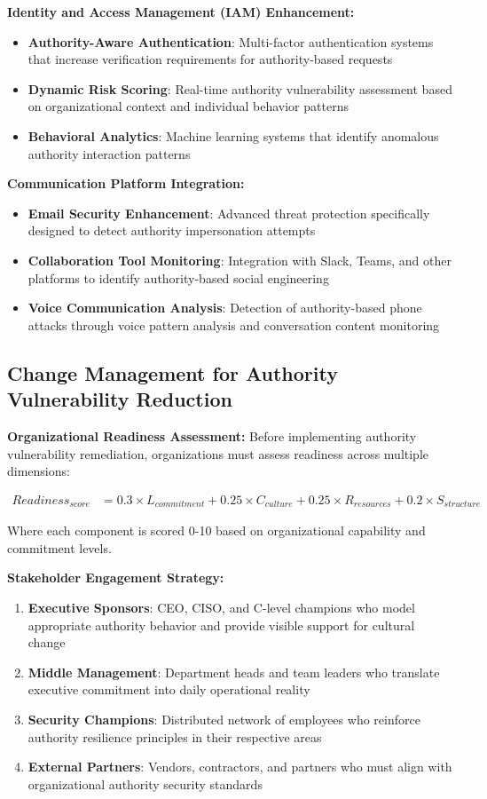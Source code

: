 \documentclass[11pt,a4paper]{article}
\begin{document}
\textbf{Identity and Access Management (IAM) Enhancement:}
\begin{itemize}
\item \textbf{Authority-Aware Authentication}: Multi-factor authentication systems that increase verification requirements for authority-based requests
\item \textbf{Dynamic Risk Scoring}: Real-time authority vulnerability assessment based on organizational context and individual behavior patterns
\item \textbf{Behavioral Analytics}: Machine learning systems that identify anomalous authority interaction patterns
\end{itemize}

\textbf{Communication Platform Integration:}
\begin{itemize}
\item \textbf{Email Security Enhancement}: Advanced threat protection specifically designed to detect authority impersonation attempts
\item \textbf{Collaboration Tool Monitoring}: Integration with Slack, Teams, and other platforms to identify authority-based social engineering
\item \textbf{Voice Communication Analysis}: Detection of authority-based phone attacks through voice pattern analysis and conversation content monitoring
\end{itemize}

\subsection{Change Management for Authority Vulnerability Reduction}

\textbf{Organizational Readiness Assessment:}
Before implementing authority vulnerability remediation, organizations must assess readiness across multiple dimensions:

\begin{align}
Readiness_{score} &= 0.3 \times L_{commitment} + 0.25 \times C_{culture} + 0.25 \times R_{resources} + 0.2 \times S_{structure}
\end{align}

Where each component is scored 0-10 based on organizational capability and commitment levels.

\textbf{Stakeholder Engagement Strategy:}
\begin{enumerate}
\item \textbf{Executive Sponsors}: CEO, CISO, and C-level champions who model appropriate authority behavior and provide visible support for cultural change
\item \textbf{Middle Management}: Department heads and team leaders who translate executive commitment into daily operational reality
\item \textbf{Security Champions}: Distributed network of employees who reinforce authority resilience principles in their respective areas
\item \textbf{External Partners}: Vendors, contractors, and partners who must align with organizational authority security standards
\end{enumerate}
\end{document}
